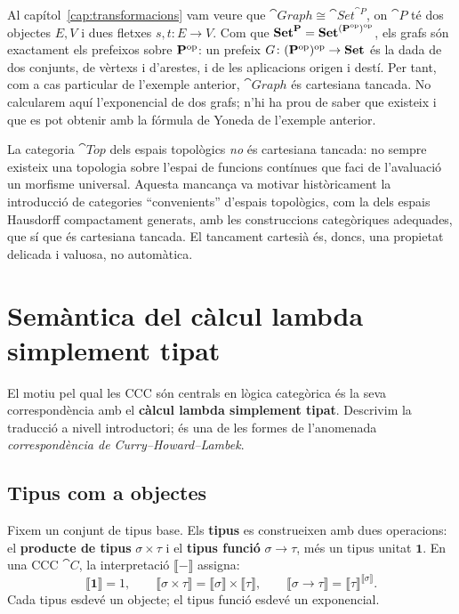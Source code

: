 \begin{exemple}[Grafs]
Al capítol~\ref{cap:transformacions} vam veure que $\cat{Graph}\cong\cat{Set}^{\cat{P}}$, on $\cat{P}$ té dos objectes $E,V$ i dues fletxes $s,t\colon E\to V$. Com que $\mathbf{Set}^{\mathbf{P}}=\mathbf{Set}^{(\mathbf{P}^{\mathrm{op}})^{\mathrm{op}}}$, els grafs són exactament els prefeixos sobre $\mathbf{P}^{\mathrm{op}}$: un prefeix $G\colon(\mathbf{P}^{\mathrm{op}})^{\mathrm{op}}\to\mathbf{Set}$ és la dada de dos conjunts, de vèrtexs i d'arestes, i de les aplicacions origen i destí. Per tant, com a cas particular de l'exemple anterior, $\cat{Graph}$ és cartesiana tancada. No calcularem aquí l'exponencial de dos grafs; n'hi ha prou de saber que existeix i que es pot obtenir amb la fórmula de Yoneda de l'exemple anterior.
\end{exemple}

\begin{observacio}
La categoria $\cat{Top}$ dels espais topològics \emph{no} és cartesiana tancada: no sempre existeix una topologia sobre l'espai de funcions contínues que faci de l'avaluació un morfisme universal. Aquesta mancança va motivar històricament la introducció de categories \enquote{convenients} d'espais topològics, com la dels espais Hausdorff compactament generats, amb les construccions categòriques adequades, que sí que és cartesiana tancada. El tancament cartesià és, doncs, una propietat delicada i valuosa, no automàtica.
\end{observacio}

\section[Semàntica del càlcul lambda simplement tipat]{Semàntica del càlcul lambda\\ simplement tipat}

El motiu pel qual les CCC són centrals en lògica categòrica és la seva correspondència amb el \textbf{càlcul lambda simplement tipat}. Descrivim la traducció a nivell introductori; és una de les formes de l'anomenada \emph{correspondència de Curry--Howard--Lambek}.

\subsection{Tipus com a objectes}

Fixem un conjunt de tipus base. Els \textbf{tipus} es construeixen amb dues operacions: el \textbf{producte de tipus} $\sigma\times\tau$ i el \textbf{tipus funció} $\sigma\to\tau$, més un tipus unitat $\mathbf{1}$. En una CCC $\cat{C}$, la interpretació $\llbracket-\rrbracket$ assigna:
\[
\llbracket\mathbf{1}\rrbracket=1,\qquad
\llbracket\sigma\times\tau\rrbracket=\llbracket\sigma\rrbracket\times\llbracket\tau\rrbracket,\qquad
\llbracket\sigma\to\tau\rrbracket=\llbracket\tau\rrbracket^{\llbracket\sigma\rrbracket}.
\]
Cada tipus esdevé un objecte; el tipus funció esdevé un exponencial.

